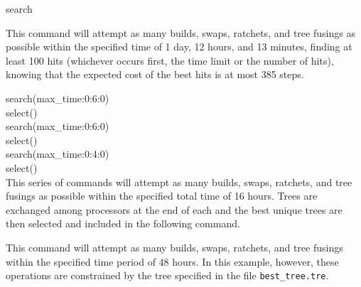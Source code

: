 \begin{command}{search}{}
\begin{arguments}


	\end{arguments}

        
    	\begin{poyexamples}
        	
            {This command will attempt as many builds, swaps, ratchets, and tree
            fusings as possible within the specified time of 1 day, 12 hours, and 13
            minutes, finding at least 100 hits (whichever occurs first, the time
            limit or the number of hits), knowing that the expected cost of the
            best hits is at most 385 steps.}
	
            {{search(max\_time:0:6:0)}\\
            {select()}\\
	   {search(max\_time:0:6:0)}\\
	    {select()}\\
	   {search(max\_time:0:4:0)}\\
	    {select()}\\
            {This series of commands will attempt as many builds, swaps, ratchets, and tree
            fusings as possible within the specified total time of 16 hours.  Trees are exchanged among
             processors at the end of each  and the best unique trees
              are then selected and included in the following
               command.}}
              
	{This command will attempt as many builds, swaps, ratchets, and tree
           fusings within the specified time period of 48 hours. In this example, however, these 
           operations are constrained by the tree specified in the file \texttt{best\_tree.tre}.} 
                      

\end{poyexamples}
\end{command}
